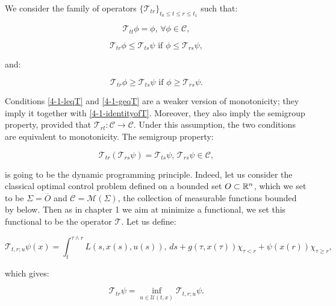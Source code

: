 We consider the family of operators $\{\mathcal{T}_{tr}\}_{t_0\leq t\leq r\leq t_1}$ such that: 

\begin{equation}\label{4-1-identityofT}
    \mathcal{T}_{tt}\phi = \phi,\, \forall\phi\in\mathcal{C},
\end{equation}

\begin{equation}\label{4-1-leqT}
    \mathcal{T}_{tr}\phi\leq\mathcal{T}_{ts}\psi \text{ if } \phi\leq \mathcal{T}_{rs}\psi,
\end{equation}

and:

\begin{equation}\label{4-1-geqT}
    \mathcal{T}_{tr}\phi\geq\mathcal{T}_{ts}\psi \text{ if } \phi\geq \mathcal{T}_{rs}\psi.
\end{equation}

Conditions \ref{4-1-leqT} and \ref{4-1-geqT} are a weaker version of monotonicity; they imply it together with \ref{4-1-identityofT}. 
Moreover, they also imply the semigroup property, provided that $\mathcal{T}_{rt}:\mathcal{C}\rightarrow\mathcal{C}$. Under this assumption,
the two conditions are equivalent to monotonicity. The semigroup property:

\begin{equation}
    \mathcal{T}_{tr}\left(\mathcal{T}_{rs}\psi\right)=\mathcal{T}_{ts}\psi,\,\mathcal{T}_{rs}\psi\in\mathcal{C},
\end{equation}

is going to be the dynamic programming principle. Indeed, let us consider the classical optimal control problem defined on a bounded set 
$O\subset\mathbb{R}^n$, which we set to be $\Sigma=\overline{O}$ and $\mathcal{C}=\mathcal{M}(\Sigma)$, the collection of measurable functions bounded by below. Then as in chapter 1 we aim at minimize a functional, 
we set this functional to be the operator $\mathcal{T}$. Let us define:

\begin{equation}\label{4-1-valuefunctreform}
    \mathcal{T}_{t,r;u}\psi(x) = \int_t^{\tau\wedge r}L(s,x(s),u(s)),\,ds + g(\tau,x(\tau))\chi_{\tau<r} + \psi(x(r))\chi_{\tau\geq r}, 
\end{equation}

which gives:

\begin{equation}\label{4-1-defofT_dynam}
    \mathcal{T}_{tr}\psi = \inf_{u\in\mathcal{U}(t,x)} \mathcal{T}_{t,r;u}\psi.
\end{equation}

